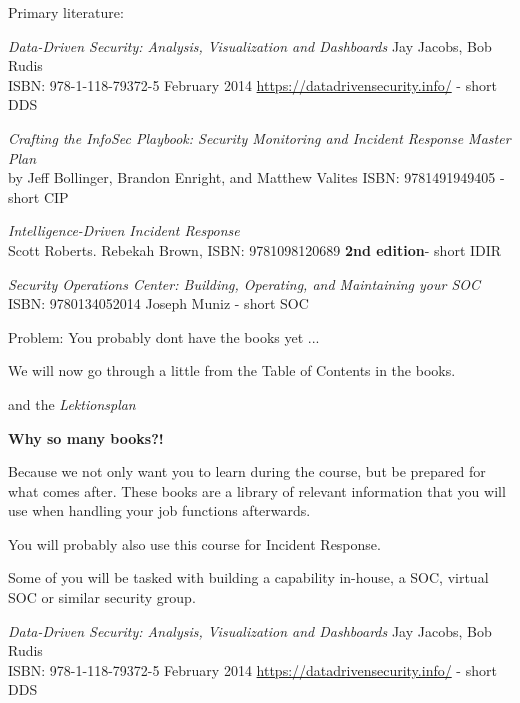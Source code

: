 \documentclass[Screen16to9,17pt]{foils}
\begin{document}

Primary literature:
\begin{list2}
\item \emph{Data-Driven Security: Analysis, Visualization and Dashboards} Jay Jacobs, Bob Rudis\\
ISBN: 978-1-118-79372-5 February 2014 \url{https://datadrivensecurity.info/} - short DDS
\item \emph{Crafting the InfoSec Playbook: Security Monitoring and Incident Response Master Plan}\\
 by Jeff Bollinger, Brandon Enright, and Matthew Valites ISBN: 9781491949405 - short CIP
\item \emph{Intelligence-Driven Incident Response} \\
 Scott Roberts. Rebekah Brown, ISBN: 9781098120689 {\bf 2nd edition}- short IDIR

\item \emph{Security Operations Center: Building, Operating, and Maintaining your SOC}\\
ISBN: 9780134052014 Joseph Muniz - short SOC
\end{list2}

\centerline{Problem: You probably dont have the books yet ...}


We will now go through a little from the Table of Contents in the books.

and the \emph{Lektionsplan}\\


{\bf Why so many books?!}

Because we not only want you to learn during the course, but be prepared for what comes after. These books are a library of relevant information that you will use when handling your job functions afterwards.

You will probably also use this course for Incident Response.

Some of you will be tasked with building a capability in-house, a SOC, virtual SOC or similar security group.


\emph{Data-Driven Security: Analysis, Visualization and Dashboards} Jay Jacobs, Bob Rudis\\
ISBN: 978-1-118-79372-5 February 2014 \url{https://datadrivensecurity.info/} - short DDS
\end{document}
